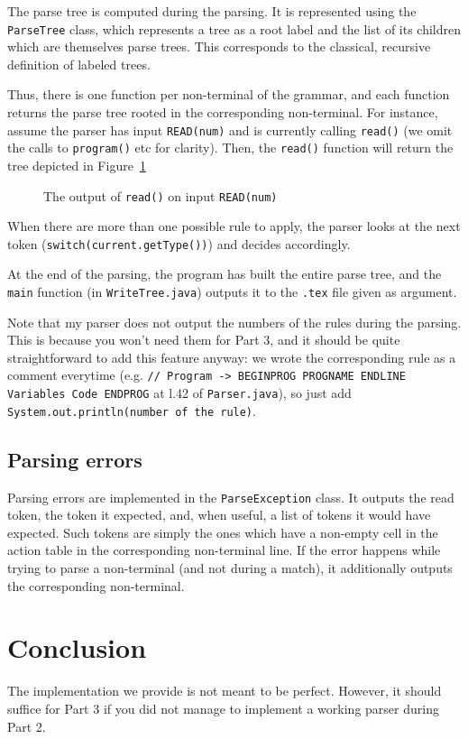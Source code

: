 \documentclass[a4paper]{scrartcl}
\begin{document}
The parse tree is computed during the parsing. It is represented using the \texttt{ParseTree} class, which represents a tree as a root label and the list of its children which are themselves parse trees. This corresponds to the classical, recursive definition of labeled trees.

Thus, there is one function per non-terminal of the grammar, and each function returns the parse tree rooted in the corresponding non-terminal. For instance, assume the parser has input \texttt{READ(num)} and is currently calling \texttt{read()} (we omit the calls to \texttt{program()} etc for clarity). Then, the \texttt{read()} function will return the tree depicted in Figure~\ref{fig:readTree}

\begin{figure}[ht]
 \centering
{}
\caption{The output of \texttt{read()} on input \texttt{READ(num)}}
\label{fig:readTree}
\end{figure}

When there are more than one possible rule to apply, the parser looks at the next token (\texttt{switch(current.getType())}) and decides accordingly.

At the end of the parsing, the program has built the entire parse tree, and the \texttt{main} function (in \texttt{WriteTree.java}) outputs it to the \texttt{.tex} file given as argument.

Note that my parser does not output the numbers of the rules during the parsing. This is because you won't need them for Part 3, and it should be quite straightforward to add this feature anyway: we wrote the corresponding rule as a comment everytime (e.g. \texttt{// Program -> BEGINPROG PROGNAME ENDLINE Variables Code ENDPROG} at l.42 of \texttt{Parser.java}), so just add \texttt{System.out.println(number of the rule)}.

\subsection{Parsing errors}

Parsing errors are implemented in the \texttt{ParseException} class. It outputs the read token, the token it expected, and, when useful, a list of tokens it would have expected. Such tokens are simply the ones which have a non-empty cell in the action table in the corresponding non-terminal line. If the error happens while trying to parse a non-terminal (and not during a match), it additionally outputs the corresponding non-terminal.

\section{Conclusion}

The implementation we provide is not meant to be perfect. However, it should suffice for Part 3 if you did not manage to implement a working parser during Part 2.
\end{document}
